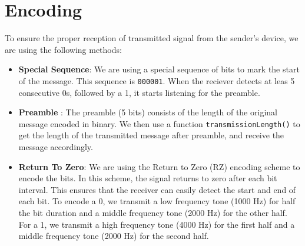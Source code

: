\documentclass[11pt]{article}
\begin{document}
\maketitle
\section{Encoding}
To ensure the proper reception of transmitted signal from the sender's device, we are using the following methods:
\begin{itemize}

    \item \textbf{Special Sequence}: We are using a special sequence of bits to mark the start of the message. This sequence is \texttt{000001}. When the reciever detects at leas 5 consecutive 0s, followed by a 1, it starts listening for the preamble. 
    \item \textbf{Preamble} : The preamble (5 bits) consists of the length of the original message encoded in binary. We then use a function \texttt{transmissionLength()} to get the length of the transmitted message after preamble, and receive the message accordingly. 
    \item \textbf{Return To Zero}: We are using the Return to Zero (RZ) encoding scheme to encode the bits. In this scheme, the signal returns to zero after each bit interval. This ensures that the receiver can easily detect the start and end of each bit. To encode a 0, we transmit a low frequency tone (1000 Hz) for half the bit duration and a middle frequency tone (2000 Hz) for the other half. For a 1, we transmit a high frequency tone (4000 Hz) for the first half and a middle frequency tone (2000 Hz) for the second half.  


\end{itemize}
\end{document}
